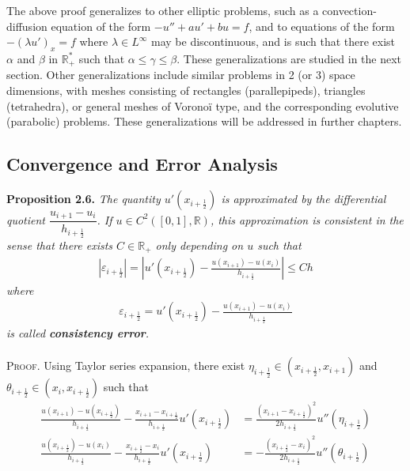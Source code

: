 \documentclass[a4paper]{article}
\numberwithin{equation}{section}
\begin{document}
The above proof generalizes to other elliptic problems, such as a convection-diffusion equation of the form $ - {u''} + a{u'} + bu = f$, and to equations of the form $ - {\left( {\lambda {u'}} \right)_x} = f$ where $\lambda  \in {L^\infty }$ may be discontinuous, and is such that there exist $\alpha$ and $\beta$ in $\mathbb{R}_+^*$ such that $\alpha \le \gamma \le \beta$. These generalizations are studied in the next section. Other generalizations include similar problems in 2 (or 3) space dimensions, with meshes consisting of rectangles (parallepipeds), triangles (tetrahedra), or general meshes of Vorono\"{i} type, and the corresponding evolutive (parabolic) problems. These generalizations will be addressed in further chapters.
\subsection{Convergence and Error Analysis}
\textbf{Proposition 2.6.} \textit{The quantity ${u'}\left( {{x_{i + \frac{1}{2}}}} \right)$ is approximated by the differential quotient $\dfrac{{{u_{i + 1}} - {u_i}}}{{{h_{i + \frac{1}{2}}}}}$. If $u \in {C^2}\left( {\left[ {0,1} \right],\mathbb{R}} \right)$, this approximation is consistent in the sense that there exists $C\in \mathbb{R}_+$ only depending on $u$ such that}
\begin{align}
\left| {{\varepsilon_{i + \frac{1}{2}}}} \right| = \left| {{u'}\left( {{x_{i + \frac{1}{2}}}} \right) - \frac{{u\left( {{x_{i + 1}}} \right) - u\left( {{x_i}} \right)}}{{{h_{i + \frac{1}{2}}}}}} \right| \le Ch
\end{align}
\textit{where}
\begin{align}
\label{2.39}
{\varepsilon _{i + \frac{1}{2}}} = u'\left( {{x_{i + \frac{1}{2}}}} \right) - \frac{{u\left( {{x_{i + 1}}} \right) - u\left( {{x_i}} \right)}}{{{h_{i + \frac{1}{2}}}}}
\end{align}
\textit{is called \textbf{consistency error}.}\\
\\
\textsc{Proof.} Using Taylor series expansion, there exist ${\eta _{i + \frac{1}{2}}} \in \left( {{x_{i + \frac{1}{2}}},{x_{i + 1}}} \right)$ and ${\theta _{i + \frac{1}{2}}} \in \left( {{x_i},{x_{i + \frac{1}{2}}}} \right)$ such that
\begin{align}
\frac{{u\left( {{x_{i + 1}}} \right) - u\left( {{x_{i + \frac{1}{2}}}} \right)}}{{{h_{i + \frac{1}{2}}}}} - \frac{{{x_{i + 1}} - {x_{i + \frac{1}{2}}}}}{{{h_{i + \frac{1}{2}}}}}u'\left( {{x_{i + \frac{1}{2}}}} \right) &= \frac{{{{\left( {{x_{i + 1}} - {x_{i + \frac{1}{2}}}} \right)}^2}}}{{2{h_{i + \frac{1}{2}}}}}u''\left( {{\eta _{i + \frac{1}{2}}}} \right)\\
\frac{{u\left( {{x_{i + \frac{1}{2}}}} \right) - u\left( {{x_i}} \right)}}{{{h_{i + \frac{1}{2}}}}} - \frac{{{x_{i + \frac{1}{2}}} - {x_i}}}{{{h_{i + \frac{1}{2}}}}}u'\left( {{x_{i + \frac{1}{2}}}} \right) &=  - \frac{{{{\left( {{x_{i + \frac{1}{2}}} - {x_i}} \right)}^2}}}{{2{h_{i + \frac{1}{2}}}}}u''\left( {{\theta _{i + \frac{1}{2}}}} \right)
\end{align}
\end{document}
